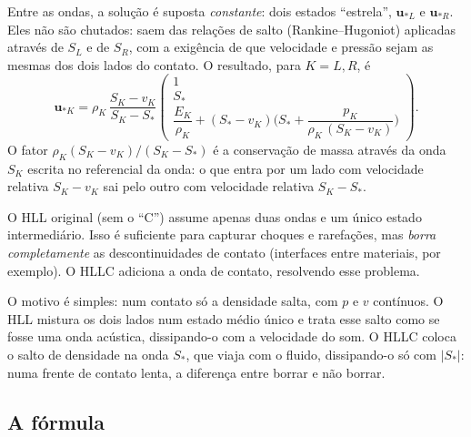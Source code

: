 \documentclass[10pt,a4paper]{article}
\newcommand{\vu}{\mathbf{u}}
\begin{document}
Entre as ondas, a solução é suposta \emph{constante}: dois estados ``estrela'', $\vu_{*L}$ e $\vu_{*R}$. Eles não são chutados: saem das relações de salto (Rankine--Hugoniot) aplicadas através de $S_L$ e de $S_R$, com a exigência de que velocidade e pressão sejam as mesmas dos dois lados do contato. O resultado, para $K=L,R$, é
\begin{equation}\label{eq:estrela}
\vu_{*K}=\rho_K\,\frac{S_K-v_K}{S_K-S_*}
\begin{pmatrix}1\\[2pt] S_*\\[2pt] \dfrac{E_K}{\rho_K}+(S_*-v_K)\Big(S_*+\dfrac{p_K}{\rho_K\,(S_K-v_K)}\Big)\end{pmatrix}.
\end{equation}
O fator $\rho_K(S_K-v_K)/(S_K-S_*)$ é a conservação de massa através da onda $S_K$ escrita no referencial da onda: o que entra por um lado com velocidade relativa $S_K-v_K$ sai pelo outro com velocidade relativa $S_K-S_*$.

\begin{intuicao}
O HLL original (sem o ``C'') assume apenas duas ondas e um único estado intermediário. Isso é suficiente para capturar choques e rarefações, mas \emph{borra completamente} as descontinuidades de contato (interfaces entre materiais, por exemplo). O HLLC adiciona a onda de contato, resolvendo esse problema.

O motivo é simples: num contato só a densidade salta, com $p$ e $v$ contínuos. O HLL mistura os dois lados num estado médio único e trata esse salto como se fosse uma onda acústica, dissipando-o com a velocidade do som. O HLLC coloca o salto de densidade na onda $S_*$, que viaja com o fluido, dissipando-o só com $|S_*|$: numa frente de contato lenta, a diferença entre borrar e não borrar.
\end{intuicao}

\subsection{A fórmula}
\end{document}
